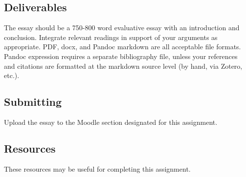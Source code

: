 \documentclass[]{article}
\begin{document}
\subsection{Deliverables}\label{deliverables}

The essay should be a 750-800 word evaluative essay with an introduction
and conclusion. Integrate relevant readings in support of your arguments
as appropriate. PDF, docx, and Pandoc markdown are all acceptable file
formats. Pandoc expression requires a separate bibliography file, unless
your references and citations are formatted at the markdown source level
(by hand, via Zotero, etc.).

\subsection{Submitting}\label{submitting-1}

Upload the essay to the Moodle section designated for this assignment.

\subsection{Resources}\label{resources}

These resources may be useful for completing this assignment.
\end{document}

